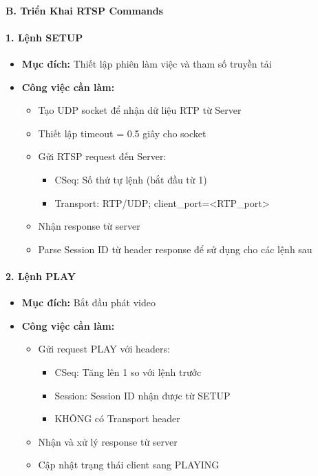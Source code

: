\documentclass[a4paper,12pt]{article}
\begin{document}
\paragraph{B. Triển Khai RTSP Commands}

\paragraph{1. Lệnh SETUP}
\begin{itemize}
    \item \textbf{Mục đích:} Thiết lập phiên làm việc và tham số truyền tải
    \item \textbf{Công việc cần làm:}
    \begin{itemize}
        \item Tạo UDP socket để nhận dữ liệu RTP từ Server
        \item Thiết lập timeout = 0.5 giây cho socket
        \item Gửi RTSP request đến Server:
        \begin{itemize}
            \item CSeq: Số thứ tự lệnh (bắt đầu từ 1)
            \item Transport: RTP/UDP; client\_port=<RTP\_port>
        \end{itemize}
        \item Nhận response từ server
        \item Parse Session ID từ header response để sử dụng cho các lệnh sau
    \end{itemize}
\end{itemize}

\paragraph{2. Lệnh PLAY}
\begin{itemize}
    \item \textbf{Mục đích:} Bắt đầu phát video
    \item \textbf{Công việc cần làm:}
    \begin{itemize}
        \item Gửi request PLAY với headers:
        \begin{itemize}
            \item CSeq: Tăng lên 1 so với lệnh trước
            \item Session: Session ID nhận được từ SETUP
            \item KHÔNG có Transport header
        \end{itemize}
        \item Nhận và xử lý response từ server
        \item Cập nhật trạng thái client sang PLAYING
    \end{itemize}
\end{itemize}
\end{document}
